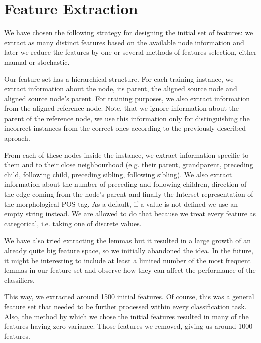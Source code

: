 \section{Feature Extraction}
\label{sec:feat_extract}


We have chosen the following strategy for designing the initial set of features:
we extract as many distinct features based on the available node information
and later we reduce the features by one or several methods
of features selection, either manual or stochastic.

Our feature set has a hierarchical structure. For each training instance, we extract
information about the node, its parent, the aligned source node and aligned source node's
parent. For training purposes, we also extract information from the aligned reference
node. Note, that we ignore information about the parent of the reference node, we
use this information only for distinguishing the incorrect instances from the correct ones
according to the previously described aproach.

From each of these  nodes inside the instance, we extract information
specific to them and to their close neighbourhood (e.g. their parent, grandparent,
preceding child, following child, preceding sibling, following sibling). We
also extract information about the number of preceding and following children,
direction of the edge coming from the node's parent and finally the Interset representation
of the morphological POS tag. As a default, if a value is not defined we use an empty string instead.
We are allowed to do that because we treat every feature as categorical, i.e. taking one of discrete values.

We have also tried extracting the lemmas but it resulted in a
large growth of an already quite big feature space, so we initially abandoned the idea.
In the future, it might be interesting to include at least a limited number of the most frequent lemmas in our
feature set and observe how they can affect the performance of the classifiers.

This way, we extracted around 1500 initial features. Of course, this was a general feature
set that needed to be further processed within every classification task. Also, the method
by which we chose the initial features resulted in many of the features having zero
variance. Those features we removed, giving us around 1000 features.


